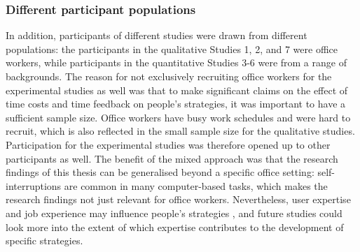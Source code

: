 

\subsubsection{Different participant populations}
In addition, participants of different studies were drawn from different populations: the participants in the qualitative Studies 1, 2, and 7 were office workers, while participants in the quantitative Studies 3-6 were from a range of backgrounds. The reason for not exclusively recruiting office workers for the experimental studies as well was that to make significant claims on the effect of time costs and time feedback on people's strategies, it was important to have a sufficient sample size. Office workers have busy work schedules and were hard to recruit, which is also reflected in the small sample size for the qualitative studies. Participation for the experimental studies was therefore opened up to other participants as well. The benefit of the mixed approach was that the research findings of this thesis can be generalised beyond a specific office setting: self-interruptions are common in many computer-based tasks, which makes the research findings not just relevant for office workers. Nevertheless, user expertise and job experience may influence people's strategies \citep{Weir2007}, and future studies could look more into the extent of which expertise contributes to the development of specific strategies. 


